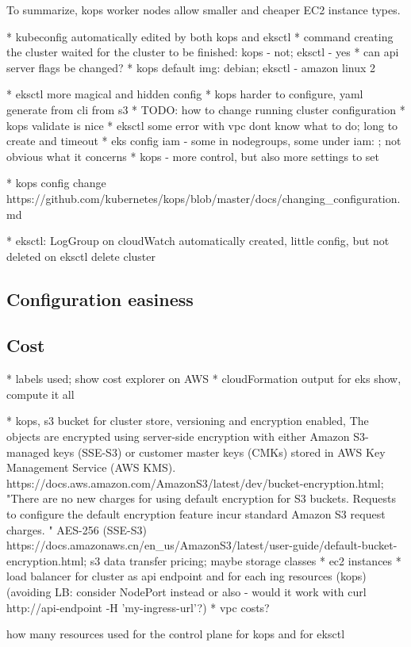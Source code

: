 To summarize, kops worker nodes allow smaller and cheaper EC2 instance types.


* kubeconfig automatically edited by both kops and eksctl
* command creating the cluster waited for the cluster to be finished: kops - not; eksctl - yes
* can api server flags be changed?
* kops default img: debian; eksctl - amazon linux 2

* eksctl more magical and hidden config
* kops harder to configure, yaml generate from cli from s3
* TODO: how to change running cluster configuration
* kops validate is nice
* eksctl some error with vpc dont know what to do; long to create and timeout
* eks config iam - some in nodegroups, some under iam: ; not obvious what it concerns
* kops - more control, but also more settings to set

* kops config change https://github.com/kubernetes/kops/blob/master/docs/changing_configuration.md

* eksctl: LogGroup on cloudWatch automatically created, little config, but not deleted on eksctl delete cluster

\subsection{Configuration easiness}
\subsection{Cost}
* labels used; show cost explorer on AWS
* cloudFormation output for eks show, compute it all


* kops, s3 bucket for cluster store, versioning and encryption enabled,  The objects are encrypted using server-side encryption with either Amazon S3-managed keys (SSE-S3) or customer master keys (CMKs) stored in AWS Key Management Service (AWS KMS). https://docs.aws.amazon.com/AmazonS3/latest/dev/bucket-encryption.html; "There are no new charges for using default encryption for S3 buckets. Requests to configure the default encryption feature incur standard Amazon S3 request charges. " AES-256 (SSE-S3) https://docs.amazonaws.cn/en_us/AmazonS3/latest/user-guide/default-bucket-encryption.html; s3 data transfer pricing; maybe storage classes
* ec2 instances
* load balancer for cluster as api endpoint and for each ing resources (kops) (avoiding LB: consider NodePort instead or also - would it work with curl http://api-endpoint -H 'my-ingress-url'?)
* vpc costs?

how many resources used for the control plane for kops and for eksctl

